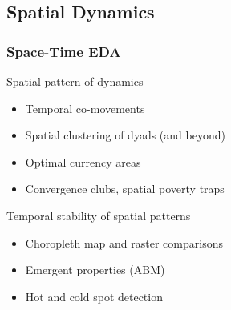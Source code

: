\documentclass{beamer}
\begin{document}
\subsection{Spatial Dynamics}
\begin{frame}\frametitle{Space-Time EDA}
  \begin{block}{Spatial pattern of dynamics}
    \begin{itemize}
      \item Temporal co-movements
      \item Spatial clustering of dyads (and beyond)
      \item Optimal currency areas
       \item Convergence clubs, spatial poverty traps
    \end{itemize}
  \end{block}
  \begin{block}{Temporal stability of spatial patterns}
    \begin{itemize}
      \item Choropleth map and raster comparisons
      \item Emergent properties (ABM)
      \item Hot and cold spot detection
    \end{itemize}
  \end{block}
\end{frame}
\end{document}
